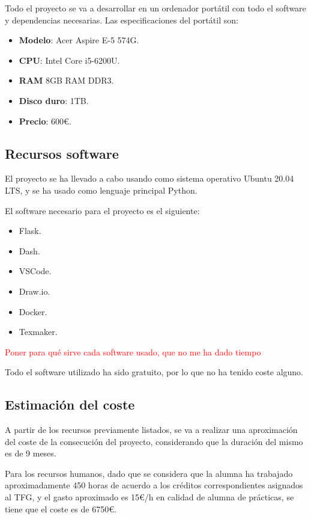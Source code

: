 Todo el proyecto se va a desarrollar en un ordenador portátil con todo el software y dependencias necesarias. Las especificaciones del portátil son:

\begin{itemize}
\item \textbf{Modelo}: Acer Aspire E-5 574G.
\item \textbf{CPU}: Intel Core i5-6200U.
\item \textbf{RAM} 8GB RAM DDR3.
\item \textbf{Disco duro}: 1TB.
\item \textbf{Precio}: 600€.
\end{itemize}

\subsection{Recursos software}

El proyecto se ha llevado a cabo usando como sistema operativo Ubuntu 20.04 LTS, y se ha usado como lenguaje principal Python.

El software necesario para el proyecto es el siguiente:

\begin{itemize}
\item Flask.
\item Dash.
\item VSCode.
\item Draw.io.
\item Docker.
\item Texmaker.
\end{itemize}

\textcolor{red}{Poner para qué sirve cada software usado, que no me ha dado tiempo}

Todo el software utilizado ha sido gratuito, por lo que no ha tenido coste alguno.

\subsection{Estimación del coste}

A partir de los recursos previamente listados, se va a realizar una aproximación del coste de la consecución del proyecto, considerando que la duración del mismo es de 9 meses.

Para los recursos humanos, dado que se considera que la alumna ha trabajado aproximadamente 450 horas de acuerdo a los créditos correspondientes asignados al TFG, y el gasto aproximado es 15€/h en calidad de alumna de prácticas, se tiene que el coste es de 6750€.

